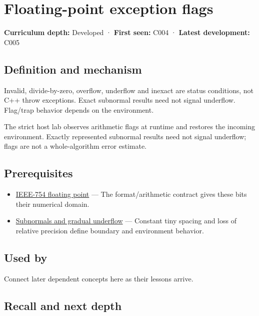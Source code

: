 \hypertarget{appendix-ed8531b46754}{}
\section{Floating-point exception flags}\label{appendix-ed8531b46754-floating-point-exception-flags}

\textbf{Curriculum depth:} Developed · \textbf{First seen:} C004 · \textbf{Latest development:} C005

\subsection{Definition and mechanism}\label{appendix-ed8531b46754-definition-and-mechanism}

Invalid, divide-by-zero, overflow, underflow and inexact are status conditions, not C++ throw exceptions. Exact subnormal results need not signal underflow. Flag/trap behavior depends on the environment.

The strict host lab observes arithmetic flags at runtime and restores the incoming environment. Exactly represented subnormal results need not signal underflow; flags are not a whole-algorithm error estimate.

\subsection{Prerequisites}\label{appendix-ed8531b46754-prerequisites}

\begin{itemize}
\tightlist
\item
  \hyperref[appendix-343615f49ddf]{IEEE-754 floating point} --- The format/arithmetic contract gives these bits their numerical domain.
\item
  \hyperref[appendix-00a6e044c437]{Subnormals and gradual underflow} --- Constant tiny spacing and loss of relative precision define boundary and environment behavior.
\end{itemize}

\subsection{Used by}\label{appendix-ed8531b46754-used-by}

Connect later dependent concepts here as their lessons arrive.

\subsection{Recall and next depth}\label{appendix-ed8531b46754-recall-and-next-depth}

